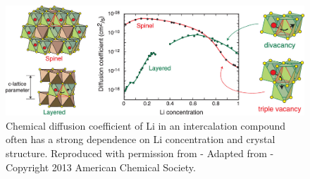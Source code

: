 \documentclass[../main.tex]{subfiles}
\begin{document}
\begin{figure}
    \centering
    \includegraphics[scale=0.26]{figures/LixTiS2_diffusion.jpeg}
    \caption{ Chemical diffusion coefficient of Li in an intercalation compound often has a strong dependence on Li concentration and crystal structure. Reproduced with permission from  - Adapted from  - Copyright 2013 American Chemical Society.}
    \label{fig:LixTiS2_diffusion}
\end{figure}
\end{document}
